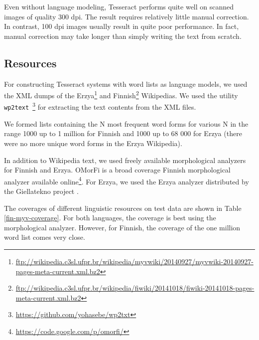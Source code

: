 \documentclass[b5paper]{article}
\begin{document}
Even without language modeling, Tesseract performs quite well on
scanned images of quality 300 dpi. The result requires relatively
little manual correction. In contrast, 100 dpi images usually result
in quite poor performance. In fact, manual correction may take
longer than simply writing the text from scratch.

\subsection{Resources}
For constructing Tesseract systems with word lists as language models,
we used the XML dumps of the
Erzya\footnote{\url{ftp://wikipedia.c3sl.ufpr.br/wikipedia/myvwiki/20140927/myvwiki-20140927-pages-meta-current.xml.bz2}}
and
Finnish\footnote{\url{ftp://wikipedia.c3sl.ufpr.br/wikipedia/fiwiki/20141018/fiwiki-20141018-pages-meta-current.xml.bz2}}
Wikipedias. We used the utility {\tt
  wp2text}~\footnote{\url{https://github.com/yohasebe/wp2txt}} for
extracting the text contents from the XML files.

We formed lists containing the N most frequent word forms for various
N in the range 1000 up to 1 million for Finnish and 1000 up to 68 000
for Erzya (there were no more unique word forms in the Erzya
Wikipedia).
 
In addition to Wikipedia text, we used freely available morphological
analyzers for Finnish and Erzya. OMorFi \cite{pirinen11} is a broad
coverage Finnish morphological analyzer available
online\footnote{\url{https://code.google.com/p/omorfi/}}. For Erzya,
we used the Erzya analyzer distributed by the Giellatekno project
\cite{moshagen14}.

The coverages of different linguistic resources on test data are shown
in Table \ref{fin-myv-coverage}. For both languages, the coverage is
best using the morphological analyzer. However, for Finnish, the
coverage of the one million word list comes very close.
\end{document}
